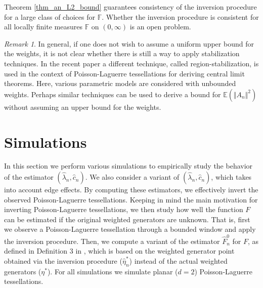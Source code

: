 \documentclass{article}
\newcommand{\EE}{\mathbb{E}}
\theoremstyle{plain}
\theoremstyle{remark}
\newtheorem{remark}{Remark}
\theoremstyle{definition}
\begin{document}
Theorem \ref{thm_an_L2_bound} guarantees consistency of the inversion procedure for a large class of choices for $\mathbb{F}$. Whether the inversion procedure is consistent for all locally finite measures $\mathbb{F}$ on $(0,\infty)$ is an open problem.

\begin{remark}
    In general, if one does not wish to assume a uniform upper bound for the weights, it is not clear whether there is still a way to apply stabilization techniques. In the recent paper \cite{Bhattacharjee2025} a different technique, called region-stabilization, is used in the context of Poisson-Laguerre tessellations for deriving central limit theorems. Here, various parametric models are considered with unbounded weights. Perhaps similar techniques can be used to derive a bound for $\EE(\Vert A_n\Vert^2)$ without assuming an upper bound for the weights.
\end{remark}


\section{Simulations}\label{section_simulations_inversion}

In this section we perform various simulations to empirically study the behavior of the estimator $(\hat{\lambda}_n,\hat{c}_n)$. We also consider a variant of $(\hat{\lambda}_n,\hat{c}_n)$, which takes into account edge effects. By computing these estimators, we effectively invert the observed Poisson-Laguerre tessellations. Keeping in mind the main motivation for inverting Poisson-Laguerre tessellations, we then study how well the function $F$ can be estimated if the original weighted generators are unknown. That is, first we observe a Poisson-Laguerre tessellation through a bounded window and apply the inversion procedure. Then, we compute a variant of the estimator $\hat{F}_n^0$ for $F$, as defined in Definition 3 in \cite{vdjagt2025b}, which is based on the weighted generator point obtained via the inversion procedure ($\hat{\eta}_n^*$) instead of the actual weighted generators ($\eta^*$). For all simulations we simulate planar ($d=2$) Poisson-Laguerre tessellations.
\end{document}
